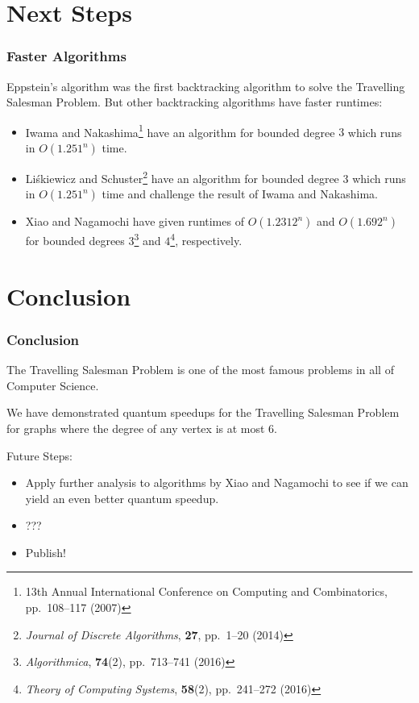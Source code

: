 \documentclass[]{beamer}
\begin{document}
\section{Next Steps}

\begin{frame}
\frametitle{Faster Algorithms}
Eppstein's algorithm was the first backtracking algorithm to solve the Travelling Salesman Problem. But other backtracking algorithms have faster runtimes:

\begin{itemize}
\item Iwama and Nakashima\footnote{13th Annual International Conference on Computing and Combinatorics, pp.\ 108--117 (2007)} have an algorithm for bounded degree $3$ which runs in $O(1.251^n)$ time.
\item Li\'{s}kiewicz and Schuster\footnote{{\em Journal of Discrete Algorithms}, {\bf 27}, pp.\ 1--20 (2014)} have an algorithm for bounded degree $3$ which runs in $O(1.251^n)$ time and challenge the result of Iwama and Nakashima.
\item Xiao and Nagamochi have given runtimes of $O(1.2312^n)$ and $O(1.692^n)$ for bounded degrees $3$\footnote{{\em Algorithmica}, {\bf 74}(2), pp.\ 713--741 (2016)} and $4$\footnote{{\em Theory of Computing Systems}, {\bf 58}(2), pp.\ 241--272 (2016)}, respectively.
\end{itemize}
\end{frame}

\section{Conclusion}

\begin{frame}
\frametitle{Conclusion}
The Travelling Salesman Problem is one of the most famous problems in all of Computer Science.

We have demonstrated quantum speedups for the Travelling Salesman Problem for graphs where the degree of any vertex is at most $6$.

Future Steps:
\begin{itemize}
\item Apply further analysis to algorithms by Xiao and Nagamochi to see if we can yield an even better quantum speedup.
\item ???
\item Publish!
\end{itemize}
\end{frame}
\end{document}
